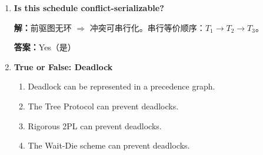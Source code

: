 \documentclass[11pt,a4paper]{article}
\newcommand{\solution}{\par\noindent\textcolor{ansblue}{\textbf{解：}}}
\newcommand{\answer}{\par\noindent\textcolor{ansred}{\textbf{答案：}}}
\begin{document}
\begin{enumerate}[leftmargin=*,itemsep=6pt]
  Options: A, B, C, D. None of above. \textcolor{gray}{原题 B 选项有问题}

  \solution 按行序提取冲突：

  \begin{itemize}[nosep]
    \item $T_1$ Read(A) $\to$ 无前驱（A 首次访问）
    \item $T_1$ Write(A) $\to$ 与前面的自身 Read 不构成跨事务冲突
    \item $T_2$ Write(A) $\to$ 冲突于 $T_1$ 的 Write(A)：$T_1 \to T_2$
          也冲突于 $T_1$ 的 Read(A) 吗？读在写之前，$T_1: R(A) \to T_2: W(A)$，这是 $T_1 \to T_2$。
    \item $T_2$ Read(B) $\to$ B 首次被访问，无冲突
    \item $T_3$ Read(B) $\to$ 与 $T_2$ 的 Read(B) 不冲突（两个读）
    \item $T_3$ Write(B) $\to$ 冲突于 $T_2$ Read(B)：$T_2 \to T_3$
    \item $T_3$ Read(C) $\to$ C 首次
    \item $T_3$ Write(C) $\to$ 与自身不冲突
  \end{itemize}

  边集合：$T_1 \to T_2$，$T_2 \to T_3$。无环。

  \answer 边为 $T_1 \to T_2$、$T_2 \to T_3$。

\item \textbf{Is this schedule conflict-serializable?}

  \solution 前驱图无环 $\Rightarrow$ 冲突可串行化。串行等价顺序：$T_1 \to T_2 \to T_3$。

  \answer \textcolor{ansred}{Yes（是）}

\item \textbf{True or False: Deadlock}

  \begin{enumerate}[label=(\alph*)]
    \item Deadlock can be represented in a precedence graph.
    \item The Tree Protocol can prevent deadlocks.
    \item Rigorous 2PL can prevent deadlocks.
    \item The Wait-Die scheme can prevent deadlocks.
  \end{enumerate}


\end{enumerate}
\end{document}
